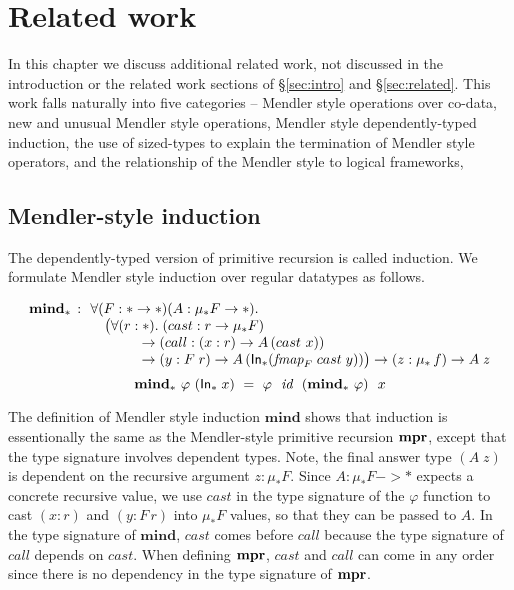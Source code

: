 \chapter{Related work}\label{ch:relwork}
In this chapter we discuss additional related work,
not discussed in the introduction or the related work sections
of \S\ref{sec:intro} and  \S\ref{sec:related}.
This work falls naturally into five categories -- Mendler style
operations over co-data, new and unusual Mendler style operations, 
Mendler style dependently-typed induction, 
the use of sized-types to explain the termination of Mendler style
operators, and 
the relationship
of the Mendler style to logical frameworks, 




\section{Mendler-style induction}
\label{sec:relwork:dep}
The dependently-typed version of primitive recursion is called induction.
We formulate Mendler style induction over regular datatypes as follows.
\vspace*{-2em}
\begin{singlespace}
\[\begin{array}{ll}
\textbf{mind}_{*} \, :
& \!\!\forall (F:* -> *) (A: \mu_{*}F -> *). \\
& ~~ \big(\forall(r:*).\;(cast : r -> \mu_{*}F) \\
& ~\qquad\quad -> (call : (x:r) -> A\,(cast~x)) \\
& ~\qquad\quad -> (y: F\;r) -> A\,(\mathsf{In}_{*}(\textit{fmap}_{F}\;cast\;y)) \big) 
-> (z:\mu_{*}\,f) -> A\;z
\end{array}
\]
\[
\textbf{mind}_{*} ~ \varphi ~ (\mathsf{In}_{*}\;x)
  ~=~ \varphi~~\textit{id}~~(\textbf{mind}_{*}~\varphi)~~x \]
\end{singlespace}\noindent
The definition of Mendler style induction $\textbf{mind}$ shows
that induction is essentionally the same as the Mendler-style primitive recursion $\mathbf{mpr}$,
except that the type signature involves dependent types.
Note, the final answer type $(A\;z)$ is dependent on
the recursive argument $z:\mu_{*}F$.
Since $A: \mu_{*}F -> *$ expects a concrete recursive value,
we use $cast$ in the type signature of the $\varphi$ function
to cast $(x:r)$ and $(y:F\,r)$ into $\mu_{*}F$ values, so that
they can be passed to $A$.
In the type signature of $\textbf{mind}$, $cast$ comes before $call$
because the type signature of $call$ depends on $cast$.
When defining $\mathbf{mpr}$, $cast$ and $call$ can come in any order
since there is no dependency in the type signature of $\mathbf{mpr}$.

